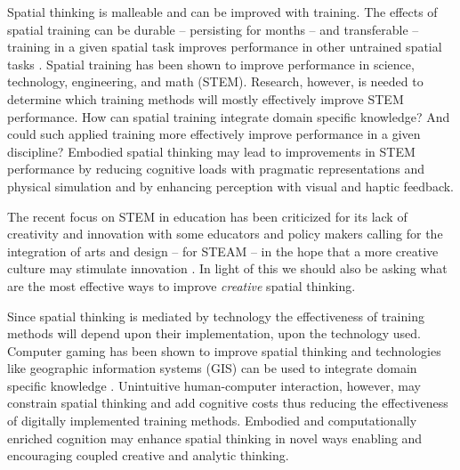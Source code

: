 \documentclass{article}
\begin{document}
Spatial thinking is malleable and can be improved with training. 
The effects of spatial training can be durable -- persisting for months -- and transferable -- training in a given spatial task improves performance in other untrained spatial tasks \citep{Uttal2013}. 
Spatial training has been shown to improve performance in science, technology, engineering, and math (STEM). 
Research, however, is needed to determine which training methods will mostly effectively improve STEM performance. 
How can spatial training integrate domain specific knowledge? And could such applied training more effectively improve performance in a given discipline? \citep{Uttal2013} 
Embodied spatial thinking may lead to improvements in STEM performance by reducing cognitive loads with pragmatic representations and physical simulation and by enhancing perception with visual and haptic feedback. 

The recent focus on STEM in education has been criticized for its lack of creativity and innovation 
with some educators and policy makers calling for the integration of arts and design -- for STEAM --
in the hope that a more creative culture may stimulate innovation \citep{Land2013,Connor2015}.
In light of this we should also be asking what are the most effective ways to improve \emph{creative} spatial thinking.

Since spatial thinking is mediated by technology the effectiveness of training methods will depend upon their implementation, upon the technology used. 
Computer gaming has been shown to improve spatial thinking and technologies like geographic information systems (GIS) can be used to integrate domain specific knowledge \citep{Uttal2013}.
Unintuitive human-computer interaction, however, may constrain spatial thinking and add cognitive costs thus reducing the effectiveness of digitally implemented training methods. 
Embodied and computationally enriched cognition may enhance spatial thinking in novel ways
enabling and encouraging coupled creative and analytic thinking.
\end{document}
